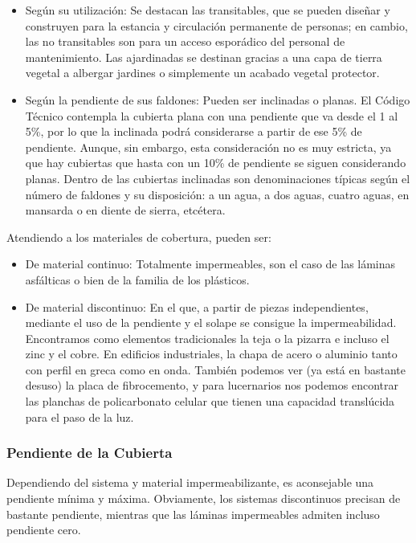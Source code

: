 \begin{itemize}
    \item Según su utilización: Se destacan las transitables, que se pueden diseñar y construyen para la estancia y circulación permanente de personas; en cambio, las no transitables son para un acceso esporádico del personal de mantenimiento. Las ajardinadas se destinan gracias a una capa de tierra vegetal a albergar jardines o simplemente un acabado vegetal protector.
    \item Según la pendiente de sus faldones: Pueden ser inclinadas o planas. El Código Técnico contempla la cubierta plana con una pendiente que va desde el 1 al 5\%, por lo que la inclinada podrá considerarse a partir de ese 5\% de pendiente. Aunque, sin embargo, esta consideración no es muy estricta, ya que hay cubiertas que hasta con un 10\% de pendiente se siguen considerando planas. Dentro de las cubiertas inclinadas son denominaciones típicas según el número de faldones y su disposición: a un agua, a dos aguas, cuatro aguas, en mansarda o en diente de sierra, etcétera.
\end{itemize}

Atendiendo a los materiales de cobertura, pueden ser:

\begin{itemize}
    \item De material continuo: Totalmente impermeables, son el caso de las láminas asfálticas o bien de la familia de los plásticos.
    \item De material discontinuo: En el que, a partir de piezas independientes, mediante el uso de la pendiente y el solape se consigue la impermeabilidad. Encontramos como elementos tradicionales la teja o la pizarra e incluso el zinc y el cobre. En edificios industriales, la chapa de acero o aluminio tanto con perfil en greca como en onda. También podemos ver (ya está en bastante desuso) la placa de fibrocemento, y para lucernarios nos podemos encontrar las planchas de policarbonato celular que tienen una capacidad translúcida para el paso de la luz.
\end{itemize}

\subsubsection*{Pendiente de la Cubierta}

Dependiendo del sistema y material impermeabilizante, es aconsejable una pendiente mínima y máxima. Obviamente, los sistemas discontinuos precisan de bastante pendiente, mientras que las láminas impermeables admiten incluso pendiente cero.

